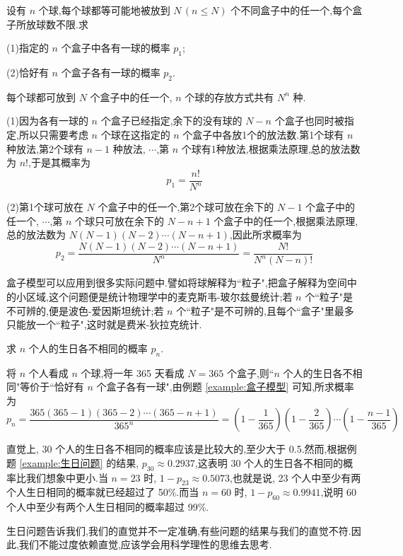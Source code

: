 \begin{example}
    \indent 设有 $n$ 个球,每个球都等可能地被放到 $N \, (n \leqslant N)$ 个不同盒子中的任一个,每个盒子所放球数不限.求

    (1)指定的 $n$ 个盒子中各有一球的概率 $p_1$;

    (2)恰好有 $n$ 个盒子各有一球的概率 $p_2$.
\end{example}

\begin{solution}
    每个球都可放到 $N$ 个盒子中的任一个, $n$ 个球的存放方式共有 $N^n$ 种.

    (1)因为各有一球的 $n$ 个盒子已经指定,余下的没有球的 $N-n$ 个盒子也同时被指定,所以只需要考虑 $n$ 个球在这指定的 $n$ 个盒子中各放1个的放法数.第1个球有 $n$ 种放法,第2个球有 $n-1$ 种放法, $\cdots$,第 $n$ 个球有1种放法,根据乘法原理,总的放法数为 $n!$,于是其概率为
    $$
    p_1 = \dfrac{n!}{N^n}
    $$

    (2)第1个球可放在 $N$ 个盒子中的任一个,第2个球可放在余下的 $N-1$ 个盒子中的任一个, $\cdots$,第 $n$ 个球只可放在余下的 $N-n+1$ 个盒子中的任一个,根据乘法原理,总的放法数为 $N (N-1) (N-2) \cdots (N-n+1)$,因此所求概率为
    $$
    p_2 = \dfrac{N (N-1) (N-2) \cdots (N-n+1)}{N^n} = \dfrac{N!}{N^n (N-n)!}
    $$
\end{solution}

\begin{note}
    \indent 盒子模型可以应用到很多实际问题中.譬如将球解释为``粒子",把盒子解释为空间中的小区域,这个问题便是统计物理学中的麦克斯韦-玻尔兹曼统计;若 $n$ 个``粒子"是不可辨的,便是波色-爱因斯坦统计;若 $n$ 个``粒子"是不可辨的,且每个``盒子"里最多只能放一个``粒子",这时就是费米-狄拉克统计.
\end{note}

\begin{example}
    \indent 求 $n$ 个人的生日各不相同的概率 $p_n$.
\end{example}

\begin{solution}
    将 $n$ 个人看成 $n$ 个球,将一年 365 天看成 $N=365$ 个盒子,则``$n$ 个人的生日各不相同"等价于``恰好有 $n$ 个盒子各有一球",由例题 \ref{example:盒子模型} 可知,所求概率为
    $$
    p_n = \dfrac{365 (365-1) (365-2) \cdots (365-n+1)}{365^n} = \left( 1 - \dfrac{1}{365} \right) \left( 1 - \dfrac{2}{365} \right) \cdots \left( 1 - \dfrac{n-1}{365} \right)
    $$
\end{solution}

\begin{note}
    \indent 直觉上, 30 个人的生日各不相同的概率应该是比较大的,至少大于 0.5.然而,根据例题 \ref{example:生日问题} 的结果, $p_{30} \approx 0.2937$,这表明 30 个人的生日各不相同的概率比我们想象中更小.当 $n=23$ 时, $1 - p_{23} \approx 0.5073$,也就是说, 23 个人中至少有两个人生日相同的概率就已经超过了 50\%.而当 $n=60$ 时, $1 - p_{60} \approx 0.9941$,说明 60 个人中至少有两个人生日相同的概率超过 99\%.

    生日问题告诉我们,我们的直觉并不一定准确,有些问题的结果与我们的直觉不符.因此,我们不能过度依赖直觉,应该学会用科学理性的思维去思考.
\end{note}

